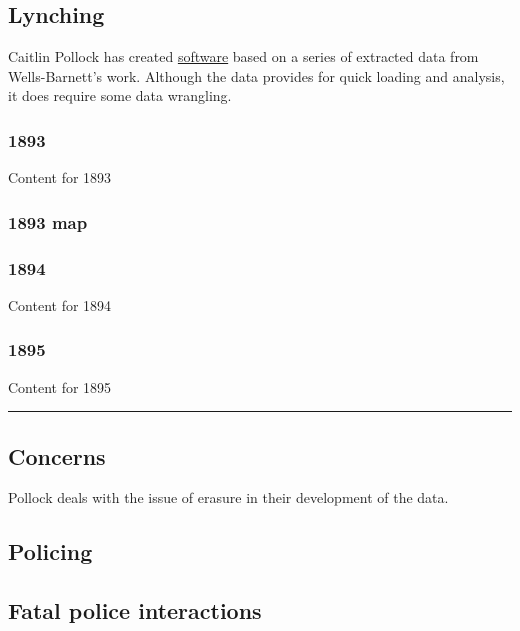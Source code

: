 \documentclass[
  letterpaper,
  DIV=11,
  numbers=noendperiod]{scrartcl}
\begin{document}
\hypertarget{lynching}{%
\subsection{Lynching}\label{lynching}}

Caitlin Pollock has created
\href{https://redrecord.cmjpollock.com/}{software} based on a series of
extracted data from Wells-Barnett's work. Although the data provides for
quick loading and analysis, it does require some data wrangling.

\subsubsection{1893}

Content for 1893

\subsubsection{1893 map}

\subsubsection{1894}

Content for 1894

\subsubsection{1895}

Content for 1895

\begin{center}\rule{0.5\linewidth}{0.5pt}\end{center}

\hypertarget{concerns}{%
\subsection{Concerns}\label{concerns}}

Pollock deals with the issue of erasure in their development of the
data.

\hypertarget{policing}{%
\subsection{Policing}\label{policing}}

\hypertarget{fatal-police-interactions}{%
\subsection{Fatal police interactions}\label{fatal-police-interactions}}
\end{document}
